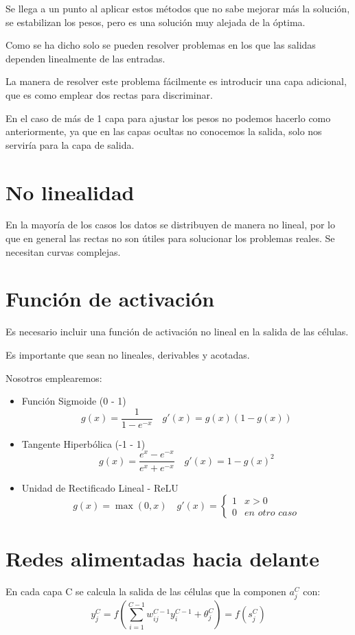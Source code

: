 \documentclass[12pt, twoside, openright]{report} %
\begin{document}
Se llega a un punto al aplicar estos métodos que no sabe mejorar más la solución, se estabilizan los pesos, pero es una solución muy alejada de la óptima.

Como se ha dicho solo se pueden resolver problemas en los que las salidas dependen linealmente de las entradas.

La manera de resolver este problema fácilmente es introducir una capa adicional, que es como emplear dos rectas para discriminar.

En el caso de más de 1 capa para ajustar los pesos no podemos hacerlo como anteriormente, ya que en las capas ocultas no conocemos la salida, solo nos serviría para la capa de salida.

\section{No linealidad}
En la mayoría de los casos los datos se distribuyen de manera no lineal, por lo que en general las rectas no son útiles para solucionar los problemas reales. Se necesitan curvas complejas.

\section{Función de activación}
Es necesario incluir una función de activación no lineal en la salida de las células. 

Es importante que sean no lineales, derivables y acotadas.
\pagebreak

Nosotros emplearemos:
\begin{itemize}
	\item Función Sigmoide (0 - 1)
	      $$g(x)=\frac{1}{1-e^{-x}}\quad g'(x)=g(x)(1-g(x))$$
	\item Tangente Hiperbólica (-1 - 1) $$g(x)=\frac{e^x-e^{-x}}{e^x+e^{-x}} \quad g'(x)=1-g(x)^2$$
	\item Unidad de Rectificado Lineal - ReLU $$g(x)=\max(0,x) \quad g'(x)= \begin{cases}1 & x > 0\\0 & \textit{en otro caso}\end{cases}$$
\end{itemize}

\section{Redes alimentadas hacia delante}
En cada capa C se calcula la salida de las células que la componen $a^C_j$ con: 
$$y^C_j=f\left(\sum^{C-1}_{i=1} w^{C-1}_{ij}y^{C-1}_i+\theta_j^C\right)=f(s^{C}_{j})$$
\end{document}
